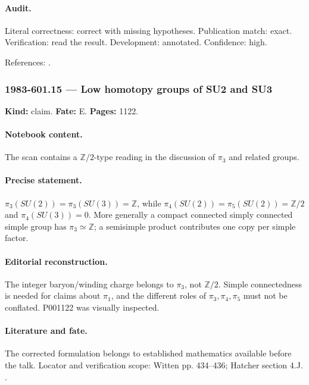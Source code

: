 \paragraph{Audit.} Literal correctness: correct with missing hypotheses. Publication match: exact. Verification: read the result. Development: annotated. Confidence: high.

\noindent References: \citep{perelomov1981instantons}.\par

\subsubsection{1983-601.15 --- Low homotopy groups of SU2 and SU3}

\label{item:1983-601.15}

\noindent\textbf{Kind:} claim. \textbf{Fate:} E. \textbf{Pages:} 1122.\par

\paragraph{Notebook content.} The scan contains a \(\mathbb Z/2\)-type reading in the discussion of \(\pi_3\) and related groups.

\paragraph{Precise statement.} \(\pi_3(SU(2))=\pi_3(SU(3))=\mathbb Z\), while \(\pi_4(SU(2))=\pi_5(SU(2))=\mathbb Z/2\) and \(\pi_4(SU(3))=0\). More generally a compact connected simply connected simple group has \(\pi_3\simeq\mathbb Z\); a semisimple product contributes one copy per simple factor.

\paragraph{Editorial reconstruction.} The integer baryon/winding charge belongs to \(\pi_3\), not \(\mathbb Z/2\). Simple connectedness is needed for claims about \(\pi_1\), and the different roles of \(\pi_3,\pi_4,\pi_5\) must not be conflated. P001122 was visually inspected.

\paragraph{Literature and fate.} The corrected formulation belongs to established mathematics available before the talk. Locator and verification scope: Witten pp. 434--436; Hatcher section 4.J. \cite{witten1983current,hatcher2002algebraic}.

